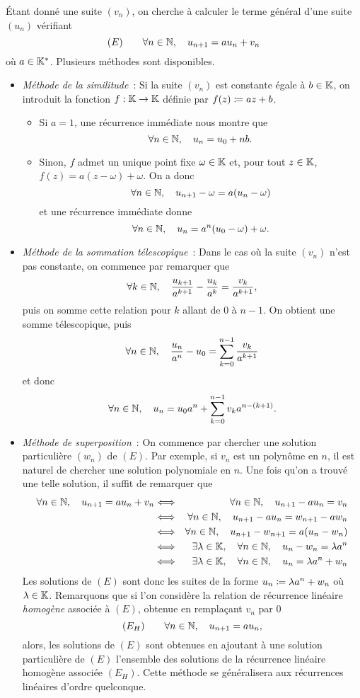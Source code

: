 \documentclass{magnolia}
\begin{document}
Étant donné une suite $(v_n)$, on cherche à calculer le terme général d'une suite $(u_n)$ vérifiant
\[(E) \qquad \forall n\in\mathbb{N},\quad u_{n+1}=a u_n + v_n\]
où $a\in\mathbb{K}^*$. Plusieurs méthodes sont disponibles.
\begin{itemize}
\item \emph{Méthode de la similitude}~: Si la suite $(v_n)$ est constante égale à $b\in\mathbb{K}$, on introduit la fonction $f:\mathbb{K}\to\mathbb{K}$ définie
  par $f(z)\coloneqq az+b$.
  \begin{itemize}
  \item Si $a=1$, une récurrence immédiate nous montre que
    \[\forall n\in\mathbb{N},\quad u_n=u_0 + nb.\]
  \item Sinon, $f$ admet un unique point fixe $\omega\in\mathbb{K}$ et, pour tout $z\in\mathbb{K}$, $f(z)=a(z-\omega)+\omega$.
    On a donc
    \[\forall n\in\mathbb{N},\quad u_{n+1}-\omega=a(u_n-\omega)\]
    et une récurrence immédiate donne
    \[\forall n\in\mathbb{N},\quad u_n = a^n(u_0-\omega) +\omega.\]
  \end{itemize}
\item \emph{Méthode de la sommation télescopique}~: Dans le cas où la suite $(v_n)$ n'est pas constante, on commence par remarquer que
\[\forall k\in\mathbb{N},\quad \frac{u_{k+1}}{a^{k+1}} - \frac{u_k}{a^k}=\frac{v_k}{a^{k+1}},\]
puis on somme cette relation pour $k$ allant de 0 à $n-1$. On obtient une somme télescopique, puis
\[\forall n\in\mathbb{N},\quad \frac{u_n}{a^n}-u_0=\sum_{k=0}^{n-1} \frac{v_k}{a^{k+1}}\]
et donc
\[\forall n\in\mathbb{N},\quad u_n=u_0 a^n + \sum_{k=0}^{n-1} v_k a^{n-(k+1)}.\]
\item \emph{Méthode de superposition}~: On commence par chercher une solution particulière $(w_n)$ de $(E)$.
  Par exemple, si $v_n$ est un polynôme en $n$, il est naturel de chercher une solution polynomiale en $n$.
  Une fois qu'on a trouvé une telle solution, il suffit de remarquer que
  \begin{eqnarray*}
  \forall n\in\mathbb{N} ,\quad u_{n+1}=a u_n+v_n
  &\Longleftrightarrow& \forall n\in\mathbb{N} ,\quad u_{n+1}-a u_n=v_n\\
  &\Longleftrightarrow& \forall n\in\mathbb{N} ,\quad u_{n+1}-a u_n=w_{n+1}-aw_n\\
  &\Longleftrightarrow& \forall n\in\mathbb{N} ,\quad u_{n+1}-w_{n+1}=a(u_n-w_n)\\
  &\Longleftrightarrow& \exists\lambda\in\mathbb{K},\quad \forall n\in\mathbb{N} ,\quad u_n-w_n=\lambda a^n\\
  &\Longleftrightarrow& \exists\lambda\in\mathbb{K},\quad \forall n\in\mathbb{N} ,\quad u_n=\lambda a^n+w_n
  \end{eqnarray*}
  Les solutions de $(E)$ sont donc les suites de la forme $u_n\coloneqq \lambda a^n+w_n$ où $\lambda\in\mathbb{K}$.
  Remarquons que si l'on considère la relation de récurrence linéaire \emph{homogène} associée à $(E)$,
  obtenue en remplaçant $v_n$ par 0
  \[(E_H) \qquad \forall n\in\mathbb{N},\quad u_{n+1}=a u_n,\]
  alors, les solutions de $(E)$ sont obtenues en ajoutant à une solution particulière de $(E)$
  l'ensemble des solutions de la récurrence linéaire homogène associée $(E_H)$. Cette méthode
  se généralisera aux récurrences linéaires d'ordre quelconque.
\end{itemize}
\end{document}
